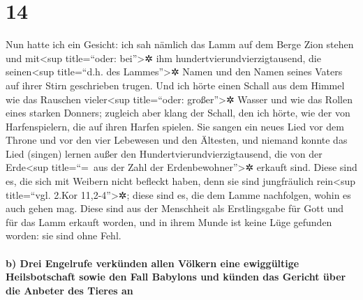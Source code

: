 \hypertarget{section-13}{%
\section{14}\label{section-13}}

 Nun hatte ich ein Gesicht: ich sah nämlich das Lamm auf
dem Berge Zion stehen und mit\textless sup title=``oder:
bei''\textgreater✲ ihm hundertvierundvierzigtausend, die
seinen\textless sup title=``d.h. des Lammes''\textgreater✲ Namen und den
Namen seines Vaters auf ihrer Stirn geschrieben trugen. 
Und ich hörte einen Schall aus dem Himmel wie das Rauschen
vieler\textless sup title=``oder: großer''\textgreater✲ Wasser und wie
das Rollen eines starken Donners; zugleich aber klang der Schall, den
ich hörte, wie der von Harfenspielern, die auf ihren Harfen spielen.
 Sie sangen ein neues Lied vor dem Throne und vor den vier
Lebewesen und den Ältesten, und niemand konnte das Lied (singen) lernen
außer den Hundertvierundvierzigtausend, die von der Erde\textless sup
title=``=~aus der Zahl der Erdenbewohner''\textgreater✲ erkauft sind.
 Diese sind es, die sich mit Weibern nicht befleckt haben,
denn sie sind jungfräulich rein\textless sup title=``vgl. 2.Kor
11,2-4''\textgreater✲; diese sind es, die dem Lamme nachfolgen, wohin es
auch gehen mag. Diese sind aus der Menschheit als Erstlingsgabe für Gott
und für das Lamm erkauft worden,  und in ihrem Munde ist
keine Lüge gefunden worden: sie sind ohne Fehl.

\hypertarget{b-drei-engelrufe-verkuxfcnden-allen-vuxf6lkern-eine-ewigguxfcltige-heilsbotschaft-sowie-den-fall-babylons-und-kuxfcnden-das-gericht-uxfcber-die-anbeter-des-tieres-an}{%
\paragraph{b) Drei Engelrufe verkünden allen Völkern eine ewiggültige
Heilsbotschaft sowie den Fall Babylons und künden das Gericht über die
Anbeter des Tieres
an}\label{b-drei-engelrufe-verkuxfcnden-allen-vuxf6lkern-eine-ewigguxfcltige-heilsbotschaft-sowie-den-fall-babylons-und-kuxfcnden-das-gericht-uxfcber-die-anbeter-des-tieres-an}}

